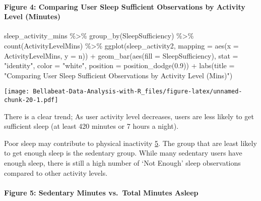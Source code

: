 \documentclass[
]{article}
\newenvironment{Shaded}{\begin{snugshade}}{\end{snugshade}}
\newcommand{\AttributeTok}[1]{\textcolor[rgb]{0.77,0.63,0.00}{#1}}
\newcommand{\FloatTok}[1]{\textcolor[rgb]{0.00,0.00,0.81}{#1}}
\newcommand{\FunctionTok}[1]{\textcolor[rgb]{0.00,0.00,0.00}{#1}}
\newcommand{\NormalTok}[1]{#1}
\newcommand{\SpecialCharTok}[1]{\textcolor[rgb]{0.00,0.00,0.00}{#1}}
\newcommand{\StringTok}[1]{\textcolor[rgb]{0.31,0.60,0.02}{#1}}
\begin{document}
\hypertarget{figure-4-comparing-user-sleep-sufficient-observations-by-activity-level-minutes}{%
\paragraph{Figure 4: Comparing User Sleep Sufficient Observations by
Activity Level
(Minutes)}\label{figure-4-comparing-user-sleep-sufficient-observations-by-activity-level-minutes}}

\begin{Shaded}
\begin{Highlighting}[]
\NormalTok{sleep\_activity\_mins }\SpecialCharTok{\%\textgreater{}\%} 
  \FunctionTok{group\_by}\NormalTok{(SleepSufficiency) }\SpecialCharTok{\%\textgreater{}\%} 
  \FunctionTok{count}\NormalTok{(ActivityLevelMins) }\SpecialCharTok{\%\textgreater{}\%} 
  \FunctionTok{ggplot}\NormalTok{(sleep\_activity2, }\AttributeTok{mapping =} \FunctionTok{aes}\NormalTok{(}\AttributeTok{x =}\NormalTok{ ActivityLevelMins, }\AttributeTok{y =}\NormalTok{ n)) }\SpecialCharTok{+} 
  \FunctionTok{geom\_bar}\NormalTok{(}\FunctionTok{aes}\NormalTok{(}\AttributeTok{fill =}\NormalTok{ SleepSufficiency), }
           \AttributeTok{stat =} \StringTok{"identity"}\NormalTok{, }\AttributeTok{color =} \StringTok{"white"}\NormalTok{, }
           \AttributeTok{position =} \FunctionTok{position\_dodge}\NormalTok{(}\FloatTok{0.9}\NormalTok{)) }\SpecialCharTok{+} 
  \FunctionTok{labs}\NormalTok{(}\AttributeTok{title =} \StringTok{"Comparing User Sleep Sufficient Observations by Activity Level (Mins)"}\NormalTok{)}
\end{Highlighting}
\end{Shaded}

\texttt{[image: Bellabeat-Data-Analysis-with-R\_files/figure-latex/unnamed-chunk-20-1.pdf]}

There is a clear trend; As user activity level decreases, users are less
likely to get sufficient sleep (at least 420 minutes or 7 hours a
night).

Poor sleep may contribute to physical inactivity
\href{https://journals.sagepub.com/doi/abs/10.1177/1559827614544437}{5}.
The group that are least likely to get enough sleep is the sedentary
group. While many sedentary users have enough sleep, there is still a
high number of `Not Enough' sleep observations compared to other
activity levels.

\hypertarget{figure-5-sedentary-minutes-vs.-total-minutes-asleep}{%
\paragraph{Figure 5: Sedentary Minutes vs.~Total Minutes
Asleep}\label{figure-5-sedentary-minutes-vs.-total-minutes-asleep}}
\end{document}
